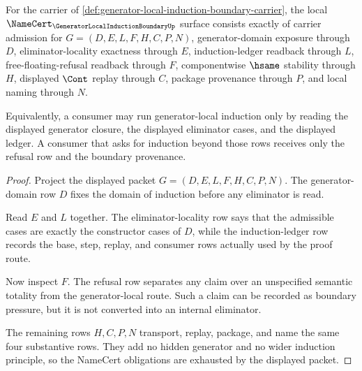 \begin{theorem}
\label{thm:generator-local-induction-boundary-namecert-obligations}
For the carrier of \autoref{def:generator-local-induction-boundary-carrier}, the local $\NameCert_{\GeneratorLocalInductionBoundaryUp}$ surface consists exactly of carrier admission for $G=(D,E,L,F,H,C,P,N)$, generator-domain exposure through $D$, eliminator-locality exactness through $E$, induction-ledger readback through $L$, free-floating-refusal readback through $F$, componentwise $\hsame$ stability through $H$, displayed $\Cont$ replay through $C$, package provenance through $P$, and local naming through $N$.

Equivalently, a consumer may run generator-local induction only by reading the displayed generator closure, the displayed eliminator cases, and the displayed ledger. A consumer that asks for induction beyond those rows receives only the refusal row and the boundary provenance.
\end{theorem}
\begin{proof}
Project the displayed packet $G=(D,E,L,F,H,C,P,N)$. The generator-domain row $D$ fixes the domain of induction before any eliminator is read.

Read $E$ and $L$ together. The eliminator-locality row says that the admissible cases are exactly the constructor cases of $D$, while the induction-ledger row records the base, step, replay, and consumer rows actually used by the proof route.

Now inspect $F$. The refusal row separates any claim over an unspecified semantic totality from the generator-local route. Such a claim can be recorded as boundary pressure, but it is not converted into an internal eliminator.

The remaining rows $H,C,P,N$ transport, replay, package, and name the same four substantive rows. They add no hidden generator and no wider induction principle, so the NameCert obligations are exhausted by the displayed packet.
\end{proof}

